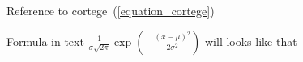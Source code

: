 \documentclass[11pt,twoside]{article}
\begin{document}
    \noindent\makebox[\linewidth]{\rule{\paperwidth}{0.4pt}}

    Reference to cortege~(\ref{equation_cortege})


    Formula in text  $
    \label{eq:normal_dist}
    \frac{1}{\sigma\sqrt{2\pi}}
    \exp\left(-\frac{(x-\mu)^2}{2\sigma^2}\right)
    $ will looks like that

    \noindent\makebox[\linewidth]{\rule{\paperwidth}{0.4pt}}
\end{document}
